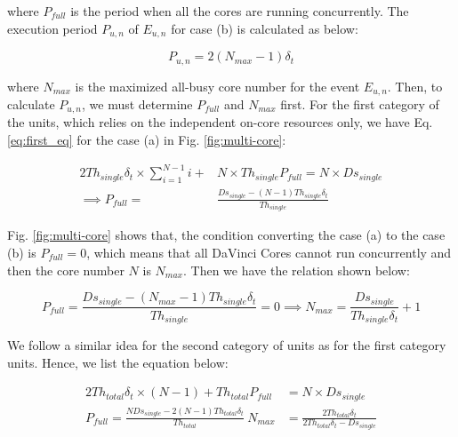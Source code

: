 where $P_{full}$ is the period when all the cores are running concurrently. The execution period $P_{u, n}$ of $E_{u, n}$ for case (b) is calculated as below:

\begin{equation}
P_{u, n} = 2 (N_{max} - 1) \delta_{t}
\end{equation}

where $N_{max}$ is the maximized all-busy core number for the event $E_{u, n}$. Then, to calculate $P_{u, n}$, we must determine $P_{full}$ and $N_{max}$ first. For the first category of the units, which relies on the independent on-core resources only, we have Eq. \ref{eq:first_eq} for the case (a) in Fig. \ref{fig:multi-core}:

\begin{equation}
\label{eq:first_eq}
\begin{aligned}
    2 Th_{single} \delta_{t} \times \sum_{i=1}^{N-1}{i} + & N \times Th_{single} P_{full} = N \times Ds_{single} \\
    \implies P_{full} = & \frac{Ds_{single} - (N - 1) Th_{single} \delta_{t}}{Th_{single}} 
\end{aligned}
\end{equation}

Fig. \ref{fig:multi-core} shows that, the condition converting the case (a) to the case (b) is $P_{full} = 0$, which means that all DaVinci Cores cannot run concurrently and then the core number $N$ is $N_{max}$. Then we have the relation shown below:

\begin{equation}
P_{full} = \frac{Ds_{single} - (N_{max} - 1) Th_{single} \delta_{t}}{Th_{single}} = 0 \implies
N_{max} = \frac{Ds_{single}}{Th_{single} \delta_{t}} + 1
\end{equation}

We follow a similar idea for the second category of units as for the first category units. Hence, we list the equation below:

\begin{equation}
\label{eq:second_eq}
    \begin{aligned}
    2 Th_{total} \delta_{t} \times (N - 1) + Th_{total} P_{full} & = N \times Ds_{single} \\
    P_{full} = \frac{N Ds_{single} - 2 (N - 1) Th_{total} \delta_{t}}{Th_{total}}
    \  
    N_{max} & = \frac{2 Th_{total} \delta_{t}}{2 Th_{total} \delta_{t} - Ds_{single}}
    \end{aligned}
\end{equation}

